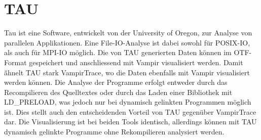 \section{TAU}
Tau ist eine Software, entwickelt von der University of Oregon, zur Analyse von parallelen Applikationen. Eine File-IO-Analyse ist dabei sowohl f\"ur POSIX-IO, als auch f\"ur MPI-IO m\"oglich. Die von TAU generierten Daten k\"onnen im OTF-Format gespeichert und anschliessend mit Vampir visualisiert werden. Damit \"ähnelt TAU stark VampirTrace, wo die Daten ebenfalls mit Vampir visualisiert werden k\"onnen. Die Analyse der Programme erfolgt entweder durch das Recompilieren des Quelltextes oder durch das Laden einer Bibliothek mit LD\_PRELOAD, was jedoch nur bei dynamisch gelinkten Programmen m\"oglich ist. Dies stellt auch den entscheidenden Vorteil von TAU gegen\"uber VampirTrace dar. Die Visualisierung ist bei beiden Tools identisch, allerdings k\"onnen mit TAU dynamisch gelinkte Programme ohne Rekompilieren analysiert werden.
\cite{Shende.03.05.2017}\cite{Shende.2011}\cite{UniversityofOregon.2018}

